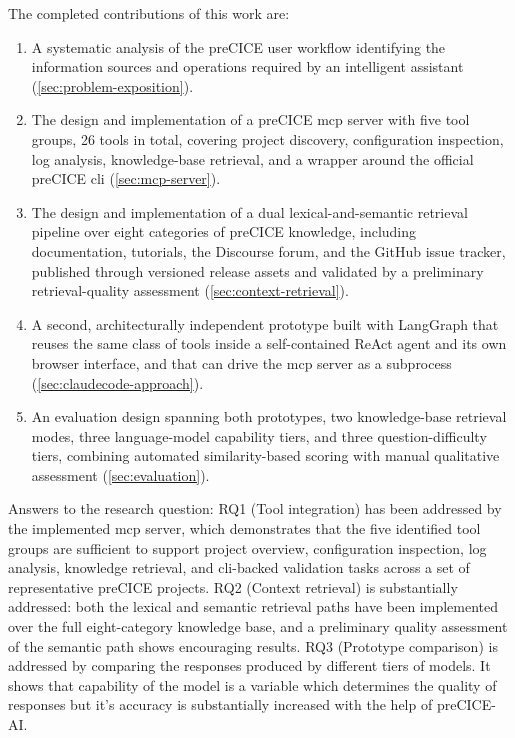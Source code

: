 \documentclass[
  numbers=noenddot,
  english,
  a4paper,
  twoside,
  bibliography=totoc,
  headsepline,
  cleardoublepage=empty,
  parskip=half,
  draft=false
]{scrbook}
\theoremstyle{break}
\renewcommand{\_}{\textunderscore\allowbreak}
\begin{document}
The completed contributions of this work are:

\begin{enumerate}
  \item A systematic analysis of the preCICE user workflow identifying the information sources
        and operations required by an intelligent assistant (\cref{sec:problem-exposition}).
  \item The design and implementation of a preCICE \gls{mcp} server with five tool groups,
        26 tools in total, covering project discovery, configuration inspection, log analysis,
        knowledge-base retrieval, and a wrapper around the official preCICE \gls{cli}
        (\cref{sec:mcp-server}).
  \item The design and implementation of a dual lexical-and-semantic retrieval pipeline over
        eight categories of preCICE knowledge, including documentation, tutorials, the
        Discourse forum, and the GitHub issue tracker, published through versioned release
        assets and validated by a preliminary retrieval-quality assessment
        (\cref{sec:context-retrieval}).
  \item A second, architecturally independent prototype built with LangGraph that reuses the
        same class of tools inside a self-contained ReAct agent and its own browser interface,
        and that can drive the \gls{mcp} server as a subprocess
        (\cref{sec:claudecode-approach}).
  \item An evaluation design spanning both prototypes, two knowledge-base retrieval modes,
        three language-model capability tiers, and three question-difficulty tiers, combining
        automated similarity-based scoring with manual qualitative assessment
        (\cref{sec:evaluation}).
\end{enumerate}



Answers to the research question: RQ1 (Tool integration) has been addressed by the implemented \gls{mcp} server, which
demonstrates that the five identified tool groups are sufficient to support project overview,
configuration inspection, log analysis, knowledge retrieval, and \gls{cli}-backed validation
tasks across a set of representative preCICE projects.
RQ2 (Context retrieval) is substantially addressed: both the lexical and semantic retrieval
paths have been implemented over the full eight-category knowledge base, and a preliminary
quality assessment of the semantic path shows encouraging results.
RQ3 (Prototype comparison) is addressed by comparing the responses produced by different tiers 
of models. It shows that capability of the model is a variable which determines the quality of responses but it's accuracy is substantially increased with the help of preCICE-AI.
\end{document}
